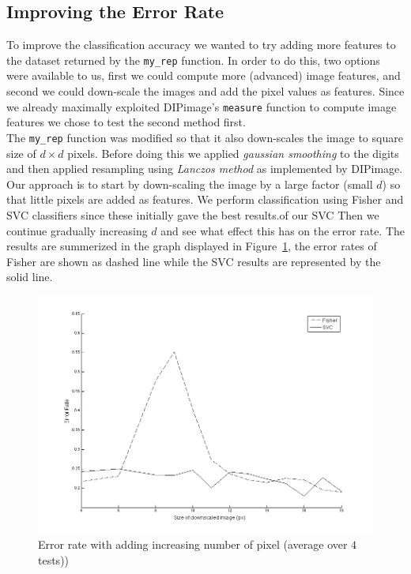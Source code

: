 \documentclass{article}
\begin{document}
\subsection{Improving the Error Rate}

To improve the classification accuracy we wanted to try adding more features to the dataset returned by the \texttt{my\_rep} function. In order to do this, two options were available to us, first we could compute more (advanced) image features, and second we could down-scale the images and add the pixel values as features. Since we already maximally exploited DIPimage's \texttt{measure} function to compute image features we chose to test the second method first. \\

The \texttt{my\_rep} function was modified so that it also down-scales the image to square size of $d \times d$ pixels. Before doing this we applied \emph{gaussian smoothing} to the digits and then applied resampling using \emph{Lanczos method} \cite{lanczos-filtering} as implemented by DIPimage. Our approach is to start by down-scaling the image by a large factor (small $d$) so that little pixels are added as features. We perform classification using Fisher and SVC classifiers since these initially gave the best results.of our SVC Then we continue gradually increasing $d$ and see what effect this has on the error rate. The results are summerized in the graph displayed in Figure~\ref{fig:error-rate-increasing-pixel-features}, the error rates of Fisher are shown as dashed line while the SVC results are represented by the solid line.

\begin{figure}[H]
    \center
    \includegraphics[trim = 25mm 10mm 25mm 10mm, clip,width=.8\textwidth]{scenario2-adding-pixels.png}
    \caption{Error rate with adding increasing number of pixel (average over $4$ tests)) \label{fig:error-rate-increasing-pixel-features}}
\end{figure}
\end{document}
